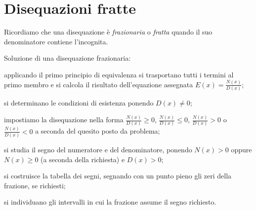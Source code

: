 \vspazio\ovalbox{\ref{ese:4.40}, \ref{ese:4.41}, \ref{ese:4.42}, \ref{ese:4.43}, \ref{ese:4.44}, \ref{ese:4.45}, \ref{ese:4.46}, \ref{ese:4.47}, \ref{ese:4.48}, \ref{ese:4.49}, \ref{ese:4.50}}
\pagebreak
\section{Disequazioni fratte}

Ricordiamo che una disequazione è \emph{frazionaria} o \emph{fratta} quando il suo denominatore contiene l'incognita.
\begin{procedura}
Soluzione di una disequazione frazionaria:
\begin{enumeratea}
\item applicando il primo principio di equivalenza si trasportano tutti i termini al primo membro e si calcola il risultato dell'equazione assegnata $E(x)=\frac{N(x)}{D(x)}$;
\item si determinano le condizioni di esistenza ponendo $D(x)\neq 0$;
\item impostiamo la disequazione nella forma $\frac{N(x)}{D(x)}\ge 0$, $\frac{N(x)}{D(x)}\le 0$, $\frac{N(x)}{D(x)}>0$ o $\frac{N(x)}{D(x)}<0$ a seconda del quesito posto da problema;
\item si studia il segno del numeratore e del denominatore, ponendo $N(x)>0$ oppure $N(x)\ge 0$ (a seconda della richiesta) e $D(x)>0$;
\item si costruisce la tabella dei segni, segnando con un punto pieno gli zeri della frazione, se richiesti;
\item si individuano gli intervalli in cui la frazione assume il segno richiesto.
\end{enumeratea}
\end{procedura}


